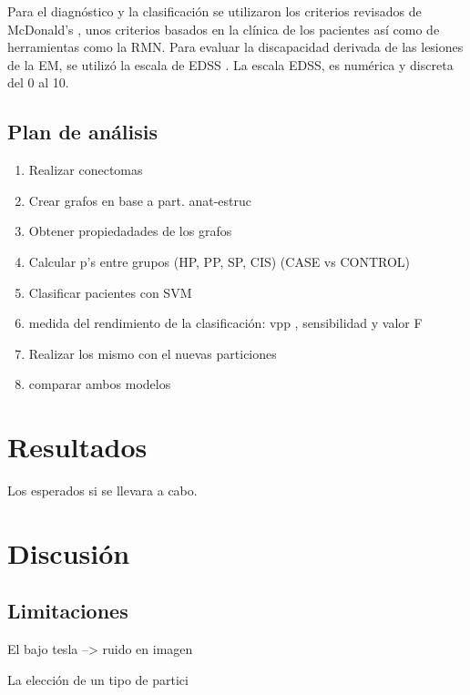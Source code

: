 \documentclass[fleqn,10pt]{UICArticle} %
\begin{document}
Para el diagnóstico y la clasificación se utilizaron los criterios revisados de McDonald's \cite{Polman2011}, unos criterios basados en la clínica de los pacientes así como de herramientas como la RMN. Para evaluar la discapacidad derivada de las lesiones de la EM, se utilizó la escala de EDSS \cite{Kurtzke1983}. La escala EDSS, es numérica y discreta del 0 al 10.

\subsection{Plan de análisis}

\begin{enumerate}[noitemsep]
\item Realizar conectomas
\item Crear grafos en base a part. anat-estruc
\item Obtener propiedadades de los grafos
\item Calcular p's entre grupos (HP, PP, SP, CIS) (CASE vs CONTROL) %
\item Clasificar pacientes con SVM
\item medida del rendimiento de la clasificación: vpp , sensibilidad y valor F
\item Realizar los mismo con el nuevas particiones
\item comparar ambos modelos
\end{enumerate}

\section{Resultados}
Los esperados si se llevara a cabo.

\section{Discusión}

\subsection{Limitaciones}

\begin{list}{-}{spacing}
\item El bajo tesla --> ruido en imagen
\item La elección de un tipo de partici
\end{list}
\end{document}
